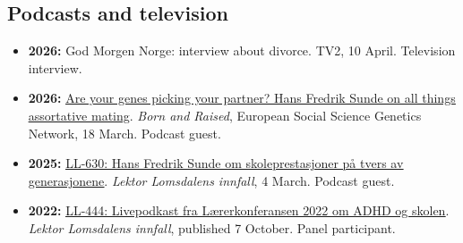 \documentclass[10pt,a4paper]{article}
\let\cvhref\href
\renewcommand{\href}[2]{\cvhref{#1}{\underline{#2}}}%
\begin{document}
\subsection*{Podcasts and television}
\begin{itemize}
\item \textbf{2026:} God Morgen Norge: interview about divorce. TV2, 10 April. Television interview.
\item \textbf{2026:} \href{https://essgn.podbean.com/e/are-your-genes-picking-your-partner-hans-fredrik-sunde-on-all-things-assortative-mating/}{Are your genes picking your partner? Hans Fredrik Sunde on all things assortative mating}. \textit{Born and Raised}, European Social Science Genetics Network, 18 March. Podcast guest.
\item \textbf{2025:} \href{https://lektorlomsdalen.no/2025/03/ll-630-hans-frendrik-sunde-om-skoleprestasjoner-pa-tvers-av-generasjonene/}{LL-630: Hans Fredrik Sunde om skoleprestasjoner på tvers av generasjonene}. \textit{Lektor Lomsdalens innfall}, 4 March. Podcast guest.
\item \textbf{2022:} \href{https://lektorlomsdalen.no/2022/10/ll-444-livepodkast-fra-laererkonferansen-2022-om-adhd-og-skolen/}{LL-444: Livepodkast fra Lærerkonferansen 2022 om ADHD og skolen}. \textit{Lektor Lomsdalens innfall}, published 7 October. Panel participant.
\end{itemize}
\end{document}
